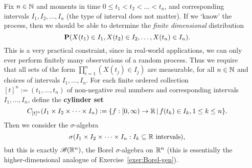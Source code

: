 Fix $n\in\mathbb{N}$ and moments in time $0 \le t_1 < t_2 < \ldots < t_n$, and corresponding intervals $I_1, I_2, \ldots, I_n$ (the type of interval does not matter). If we `know' the process, then we should be able to determine the \emph{finite dimensional} distribution
\begin{equation*}
    \mathbf{P}(X(t_1)\in I_1, X(t_2)\in I_2, \ldots, X(t_n)\in I_n).
\end{equation*}
This is a very practical constraint, since in real-world applications, we can only ever perform finitely many observations of a random process. Thus we require that all sets of the form $\prod_{i=1}^n (X(t_j)\in I_j)$ are measurable, for all $n\in\mathbb{N}$ and choices of intervals $I_1, \ldots, I_n$. For each finite ordered collection $[t]^n:=(t_1,\ldots,t_n)$ of non-negative real numbers and corresponding intervals $I_1, \ldots, I_n$, define the \textbf{cylinder set}
\begin{equation}
    C_{[t]^n}(I_1\times I_2 \times\cdots\times I_n) := \{ f : [0, \infty) \to\mathbb{R} \,|\, f(t_k) \in I_k, 1 \le k\le n\}.
\end{equation}
Then we consider the $\sigma$-algebra
\begin{equation*}
    \sigma(I_1\times I_2 \times\cdots\times I_n : I_k \subseteq\mathbb{R} \text{ intervals}),
\end{equation*}
but this is exactly $\mathscr{B}(\mathbb{R}^n)$, the Borel $\sigma$-algebra on $\mathbb{R}^n$ (this is essentially the higher-dimensional analogue of Exercise~\ref{exer:Borel-gen}).

